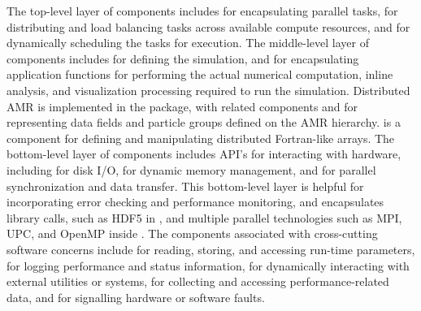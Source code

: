 \documentclass[11pt,letterpaper]{article}
\begin{document}


The top-level layer of components includes  for encapsulating parallel
tasks,  for distributing and load balancing tasks
across available compute resources, and  for
dynamically scheduling the tasks for execution.
%
The middle-level layer of components includes  for
defining the simulation, and  for encapsulating application
functions for performing the actual numerical computation, inline
analysis, and visualization processing required to run the simulation.
Distributed AMR is implemented in the  package, with related
components  and  for representing data
fields and particle groups defined on the AMR hierarchy.  
is a component for defining and manipulating distributed Fortran-like
arrays.
%
The bottom-level layer of components includes API's for interacting
with hardware, including  for disk I/O,  for
dynamic memory management, and  for parallel
synchronization and data transfer.  This bottom-level layer is helpful
for incorporating error checking and performance monitoring, and
encapsulates library calls, such as HDF5 in , and multiple
parallel technologies such as MPI, UPC, and OpenMP inside
.
%
The components associated with cross-cutting software concerns include
 for reading, storing, and accessing run-time
parameters,  for logging performance and status
information,  for dynamically interacting with external
utilities or systems,  for collecting and accessing
performance-related data, and  for signalling hardware or
software faults.

\end{document}
